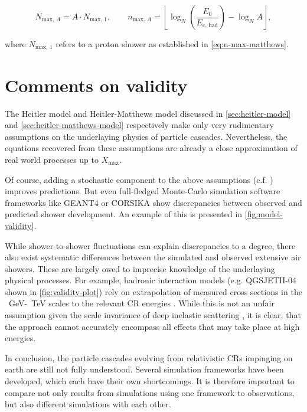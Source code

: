 \begin{equation}
N_{\text{max},\,A} = A \cdot N_{\text{max},\,1}, \qquad n_{\text{max},\,A} = \left\lfloor \log_N\left(\frac{E_0}{E_{c,\,\text{had}}}\right) - \log_N A \right\rfloor,
\end{equation}

where $N_{\text{max},\,1}$ refers to a proton shower as established in \autoref{eq:n-max-matthews}.

\section{Comments on validity}
\label{sec:cr-shower-validity}

The Heitler model and Heitler-Matthews model discussed in \autoref{sec:heitler-model} and \autoref{sec:heitler-matthews-model} respectively make only very 
rudimentary assumptions on the underlaying physics of particle cascades. Nevertheless, the equations recovered from these assumptions are already a close 
approximation of real world processes up to $X_\text{max}$. 

Of course, adding a stochastic component to the above assumptions (c.f. \cite{MartinShowerSim}) improves predictions. But even full-fledged Monte-Carlo simulation 
software frameworks like GEANT4 \cite{agostinelli2003geant4} or CORSIKA \cite{heck1998corsika} show discrepancies between observed and predicted shower development. 
An example of this is presented in \autoref{fig:model-validity}. 

While shower-to-shower fluctuations can explain discrepancies to a degree, there also exist systematic differences between the simulated and observed extensive air
showers. These are largely owed to imprecise knowledge of the underlaying physical processes. For example, hadronic interaction models (e.g. QGSJETII-04 shown in 
\autoref{fig:validity-plot}) rely on extrapolation of measured cross sections in the \SI{}{\giga\electronvolt}-\SI{}{\tera\electronvolt} scales to the relevant 
CR energies \cite{ostapchenko2006qgsjet}. While this is not an unfair assumption given the scale invariance of deep inelastic scattering \cite{fox1974early}, it is 
clear, that the approach cannot accurately encompass all effects that may take place at high energies.

In conclusion, the particle cascades evolving from relativistic CRs impinging on earth are still not fully understood. Several simulation frameworks have been 
developed, which each have their own shortcomings. It is therefore important to compare not only results from simulations using one framework to observations, but 
also different simulations with each other.

